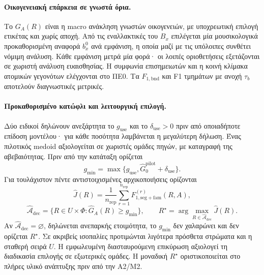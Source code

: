 \documentclass[11pt,a4paper]{article}
\begin{document}
\paragraph{Οικογενειακή επάρκεια σε γνωστά όρια.}
Το $G_A(R)$ είναι η macro ανάκληση γνωστών οικογενειών, με υποχρεωτική επιλογή ετικέτας και χωρίς αποχή. Από τις εναλλακτικές του $B_x$ επιλέγεται μία μουσικολογικά προκαθορισμένη αναφορά $b_x^0$ ανά εμφάνιση, η οποία μαζί με τις υπόλοιπες συνθέτει νόμιμη ανάλυση. Κάθε εμφάνιση μετρά μία φορά· οι λοιπές οριοθετήσεις εξετάζονται σε χωριστή ανάλυση ευαισθησίας. Η συμφωνία επισημειωτών και η κοινή κλίμακα ατομικών γεγονότων ελέγχονται στο ΠΕ0. Τα $F_{1,\mathrm{bnd}}$ και F1 τμημάτων με ανοχή $\tau_b$ αποτελούν διαγνωστικές μετρικές.

\paragraph{Προκαθορισμένο κατώφλι και λειτουργική επιλογή.}
Δύο ειδικοί δηλώνουν ανεξάρτητα το $g_{\mathrm{use}}$ και το $\delta_{\mathrm{use}}>0$ πριν από οποιαδήποτε επίδοση μοντέλου· για κάθε ποσότητα λαμβάνεται η μεγαλύτερη δήλωση. Ένας πιλοτικός medoid αξιολογείται σε χωριστές ομάδες πηγών, με καταγραφή της αβεβαιότητας. Πριν από την κατάταξη ορίζεται
\[
g_{\min}=\max\{g_{\mathrm{use}},\widehat G_0^{\mathrm{pilot}}+\delta_{\mathrm{use}}\}.
\]
Για τουλάχιστον πέντε αντιστοιχισμένες αρχικοποιήσεις ορίζονται
\[
\widehat J(R)=\frac1{n_{\mathrm{rep}}}\sum_{r=1}^{n_{\mathrm{rep}}}
F_{1,\mathrm{seg+fam}}^{(r)}(R,A),
\]
\[
\widehat{\mathcal A}_{\mathrm{dec}}=
\{R\in U\times\Phi:\widehat G_A(R)\ge g_{\min}\},\qquad
R^\star=\arg\max_{R\in\widehat{\mathcal A}_{\mathrm{dec}}}\widehat J(R).
\]
Αν $\widehat{\mathcal A}_{\mathrm{dec}}=\varnothing$, δηλώνεται ανεπαρκής ετοιμότητα, το $g_{\min}$ δεν χαλαρώνει και δεν ορίζεται $R^\star$. Σε ακριβείς ισοπαλίες προτιμώνται λιγότερα πρόσθετα στρώματα και η σταθερή σειρά $U$. Η εμφωλευμένη διασταυρούμενη επικύρωση αξιολογεί τη διαδικασία επιλογής σε εξωτερικές ομάδες. Η μοναδική $R^\star$ οριστικοποιείται στο πλήρες υλικό ανάπτυξης πριν από την Α2/Μ2.
\end{document}
